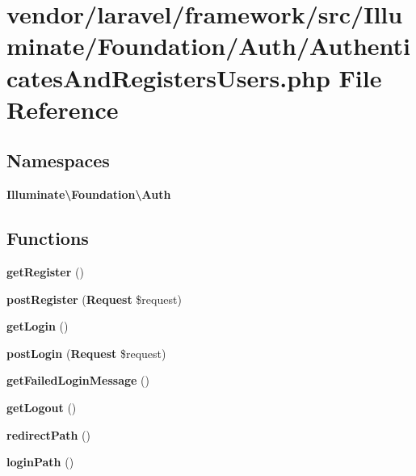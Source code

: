 \section{vendor/laravel/framework/src/\+Illuminate/\+Foundation/\+Auth/\+Authenticates\+And\+Registers\+Users.php File Reference}
\label{_authenticates_and_registers_users_8php}
\subsection*{Namespaces}
\begin{DoxyCompactItemize}
\item 
 {\bf Illuminate\textbackslash{}\+Foundation\textbackslash{}\+Auth}
\end{DoxyCompactItemize}
\subsection*{Functions}
\begin{DoxyCompactItemize}
\item 
{\bf get\+Register} ()
\item 
{\bf post\+Register} ({\bf Request} \$request)
\item 
{\bf get\+Login} ()
\item 
{\bf post\+Login} ({\bf Request} \$request)
\item 
{\bf get\+Failed\+Login\+Message} ()
\item 
{\bf get\+Logout} ()
\item 
{\bf redirect\+Path} ()
\item 
{\bf login\+Path} ()
\end{DoxyCompactItemize}
